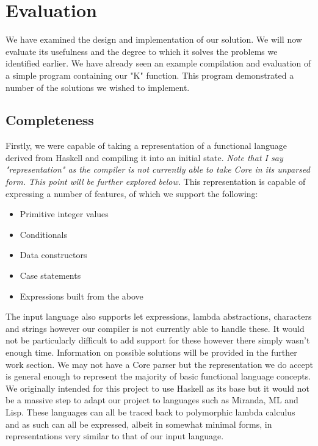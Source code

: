\section{Evaluation}
We have examined the design and implementation of our solution.
We will now evaluate its usefulness and the degree to which it
solves the problems we identified earlier. We have already seen
an example compilation and evaluation of a simple program containing
our "K" function. This program demonstrated a number of the solutions
we wished to implement.

\subsection{Completeness}
Firstly, we were capable of taking a representation of a functional
language derived from Haskell and compiling it into an initial state.
\emph{ Note that I say "representation" as the compiler is not 
currently able to take Core in its unparsed form. This point will be
further explored below.} This representation is capable of expressing
a number of features, of which we support the following:

\begin{itemize}
	\item Primitive integer values
	\item Conditionals
	\item Data constructors
	\item Case statements
	\item Expressions built from the above
\end{itemize}

\noindent The input language also supports let expressions, lambda
abstractions, characters and strings however our compiler is not
currently able to handle these. It would not be particularly 
difficult to add support for these however there simply wasn't
enough time. Information on possible solutions will be provided
in the further work section. We may not have a Core parser but
the representation we do accept is general enough to represent
the majority of basic functional language concepts. We originally
intended for this project to use Haskell as its base but it would
not be a massive step to adapt our project to languages such as
Miranda, ML and Lisp. These languages can all be traced back to
polymorphic lambda calculus~\cite[pp.10]{LC} and as such can all be expressed, 
albeit in somewhat minimal forms, in representations very similar
to that of our input language.

